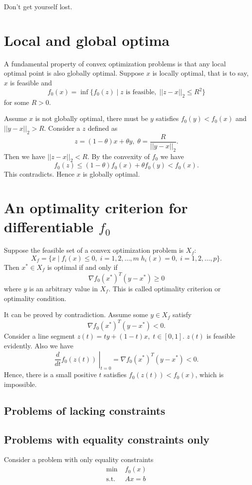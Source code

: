 \documentclass[lang=en,color=blue,mode=fancy,titlestyle=hang]{elegantbook}
\begin{document}
Don't get yourself lost.

\section{Local and global optima}
A fundamental property of convex optimization problems is that any local optimal point is
also globally optimal. Suppose $x$ is locally optimal, that is to say, $x$ is feasible and
\[
f_0(x) = \inf \{ f_0(z) \;|\; z \text{ is feasible}, \; ||z - x||_2 \leq R^2 \}
\]
for some $R > 0$.

Assume $x$ is not globally optimal, there must be $y$ satisfies $f_0(y) < f_0(x)$ and
$||y - x||_2 > R$. Consider a $z$ defined as
\[
z = (1 - \theta) x + \theta y, \; \theta = \frac{R}{||y - x||_2}.
\]
Then we have $||z - x||_2 < R$. By the convexity of $f_0$ we have
\[
f_0(z) \leq (1 - \theta) f_0(x) + \theta f_0(y) < f_0(x).
\]
This contradicts. Hence $x$ is globally optimal.

\section{An optimality criterion for differentiable $f_0$}

Suppose the feasible set of a convex optimization problem is $X_f$:
\[
X_f = \{ x \;|\; f_i(x) \leq 0, \; i = 1, 2, \ldots, m \; h_i(x) = 0, \; i = 1, 2, \ldots, p \}.
\]
Then $x^* \in X_f$ is optimal if and only if
\[
\nabla f_0(x^*)^T (y - x^*) \geq 0
\]
where $y$ is an arbitrary value in $X_f$. This is called optimality criterion or optimality
condition.

It can be proved by contradiction. Assume some $y \in X_f$ satisfy
\[
{\nabla f_0(x^*)}^T (y - x^*) < 0.
\]
Consider a line segment $z(t) = ty + (1-t)x, \; t \in [0, 1]$. $z(t)$ is feasible evidently.
Also we have
\[
\left. \frac{d}{dt} f_0(z(t)) \; \right|_{t = 0} = {\nabla f_0(x^*)}^T (y - x^*) < 0.
\]
Hence, there is a small positive $t$ satisfies $f_0(z(t)) < f_0(x)$, which is
impossible.

\subsection{Problems of lacking constraints}
\subsection{Problems with equality constraints only}

Consider a problem with only equality constraints
\begin{align*}
  \min \; &f_0(x) \\
  \text{s.t.} \; &A x = b
\end{align*}
\end{document}
